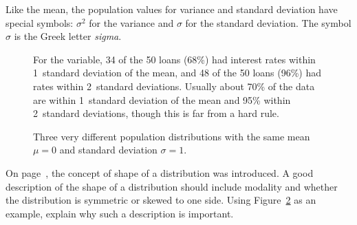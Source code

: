 Like the mean, the population values for variance
and standard deviation have special symbols:
$\sigma_{}^2$ for the variance and $\sigma$ for the
standard deviation.
The symbol $\sigma$ 
is the Greek letter \emph{sigma}.

\begin{figure}
  \centering
  \caption{For the  variable,
      34 of the 50 loans (68\%) had interest rates within
      1~standard deviation of the mean,
      and 48 of the 50 loans (96\%) had rates within
      2~standard deviations.
      Usually about 70\% of the data are within 1~standard
      deviation of the mean and 95\% within 2~standard
      deviations, though this is far from a hard rule.}
  \label{sdRuleForIntRate}
\end{figure}


\begin{figure}
  \centering
  \caption{Three very different population distributions
      with the same mean $\mu=0$ and standard deviation
      $\sigma=1$.}
  \label{severalDiffDistWithSdOf1}
\end{figure}

\begin{exercisewrap}
\begin{nexercise}
On page~\pageref{shapeFirstDiscussed}, the concept of
shape of a distribution was introduced.
A good description of the shape of a distribution should
include modality and whether the distribution is symmetric
or skewed to one side.
Using Figure~\ref{severalDiffDistWithSdOf1} as an example,
explain why such a description is
important.\footnotemark{}
\end{nexercise}
\end{exercisewrap}

